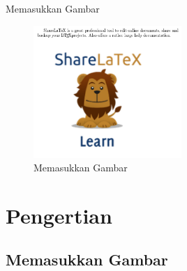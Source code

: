 \sloppy
\begin{center}{\fontsize{18pt}{18pt}\selectfont Memasukkan Gambar \\}\end{center} \par


\begin{figure}[ht]
	\centerline{\includegraphics[width=0.50\textwidth]{gambar/dapi13.jpg}}
	\caption{Memasukkan Gambar}
	\label{Memasukkan Gambar}
\end{figure}





\section {Pengertian }
\subsection {Memasukkan Gambar}

